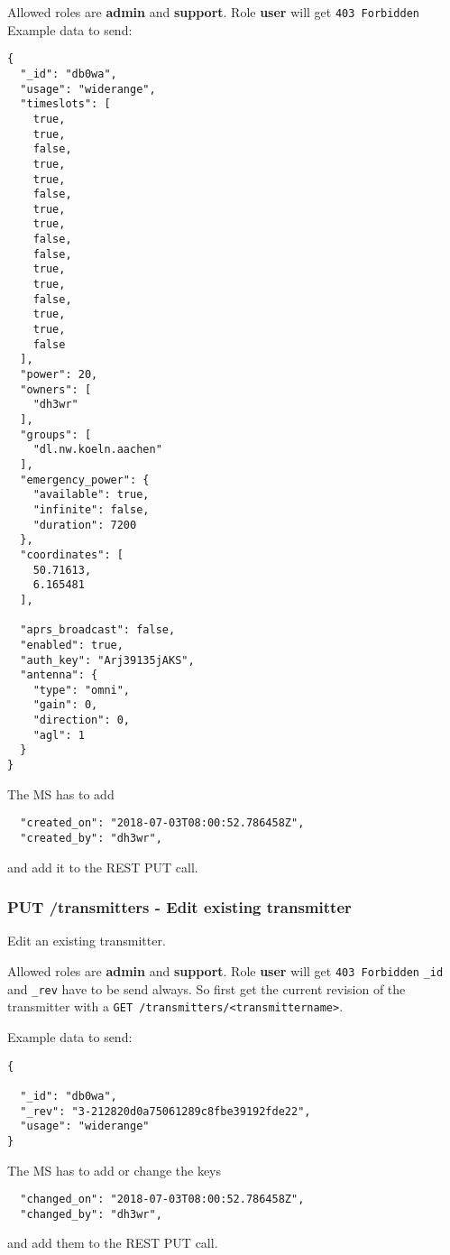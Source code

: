 Allowed roles are \textbf{admin} and \textbf{support}. Role \textbf{user} will get \verb|403 Forbidden|
Example data to send:
\begin{lstlisting}
{
  "_id": "db0wa",
  "usage": "widerange",
  "timeslots": [
    true,
    true,
    false,
    true,
    true,
    false,
    true,
    true,
    false,
    false,
    true,
    true,
    false,
    true,
    true,
    false
  ],
  "power": 20,
  "owners": [
    "dh3wr"
  ],
  "groups": [
    "dl.nw.koeln.aachen"
  ],
  "emergency_power": {
    "available": true,
    "infinite": false,
    "duration": 7200
  },
  "coordinates": [
    50.71613,
    6.165481
  ],

  "aprs_broadcast": false,
  "enabled": true,
  "auth_key": "Arj39135jAKS",
  "antenna": {
    "type": "omni",
    "gain": 0,
    "direction": 0,
    "agl": 1
  }
}
\end{lstlisting}

The MS has to add 
\begin{lstlisting}
  "created_on": "2018-07-03T08:00:52.786458Z",
  "created_by": "dh3wr",
\end{lstlisting}
and add it to the REST PUT call.


\subsubsection{PUT /transmitters - Edit existing transmitter}
Edit an existing transmitter.\\

Allowed roles are \textbf{admin} and \textbf{support}. Role \textbf{user} will get \verb|403 Forbidden|
\verb|_id| and \verb|_rev| have to be send always. So first get the current revision of the transmitter with a \verb|GET /transmitters/<transmittername>|.

Example data to send:
\begin{lstlisting}
{

  "_id": "db0wa",
  "_rev": "3-212820d0a75061289c8fbe39192fde22",
  "usage": "widerange"
}
\end{lstlisting}

The MS has to add or change the keys
\begin{lstlisting}
  "changed_on": "2018-07-03T08:00:52.786458Z",
  "changed_by": "dh3wr",
\end{lstlisting}
and add them to the REST PUT call.

